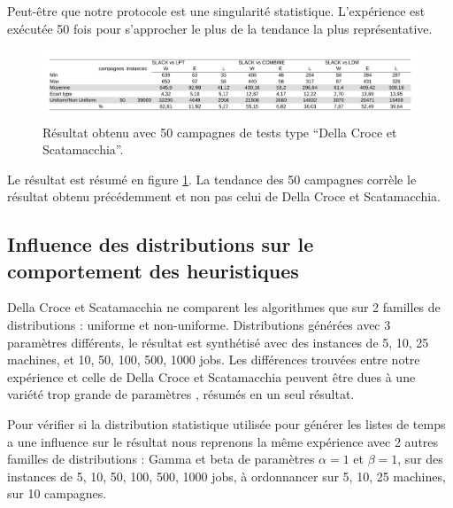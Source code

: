 \documentclass[a4paper,12pt]{report}
\theoremstyle{plain}				%
\theoremstyle{definition}				%
\begin{document}
Peut-être que notre protocole est une singularité statistique. L'expérience est exécutée 50 fois pour s'approcher le plus de la tendance la plus représentative.


\begin{figure}
{\centering
\includegraphics[width=\columnwidth]{4_Resultat_Reproduction50DCS.pdf}
\caption{Résultat obtenu avec 50 campagnes de tests type ``Della Croce et Scatamacchia''.}
\label{fig:resultatReproduction50DellaCroceScatamacchia}
\par}
\end{figure}

Le résultat est résumé en figure \ref{fig:resultatReproduction50DellaCroceScatamacchia}. 
La tendance des 50 campagnes corrèle le résultat obtenu précédemment et non pas 
  celui de Della Croce et Scatamacchia.

\subsection{Influence des distributions sur le comportement des heuristiques}
\label{ssec:resultatsInfluenceDesDistributionSurLeComportement}


Della Croce et Scatamacchia ne comparent les algorithmes que sur 2 familles de distributions : 
uniforme et non-uniforme. Distributions générées avec 3 paramètres différents, le résultat est synthétisé avec des instances de 5, 10, 25 machines, et 10, 50, 100, 500, 1000 jobs. 
Les différences trouvées entre notre expérience et celle de Della Croce et Scatamacchia peuvent 
être dues à une variété trop grande de paramètres , résumés en un seul résultat.

\bigskip
Pour vérifier si la distribution statistique utilisée pour générer les listes de temps 
  a une influence sur le résultat 
  nous reprenons la même expérience avec 2 autres familles de distributions : 
  Gamma et beta de paramètres $\alpha = 1$ et $\beta = 1$,
  sur des instances de 5, 10, 50, 100, 500, 1000 jobs, 
  à ordonnancer sur 5, 10, 25 machines,
  sur 10 campagnes.
\end{document}
